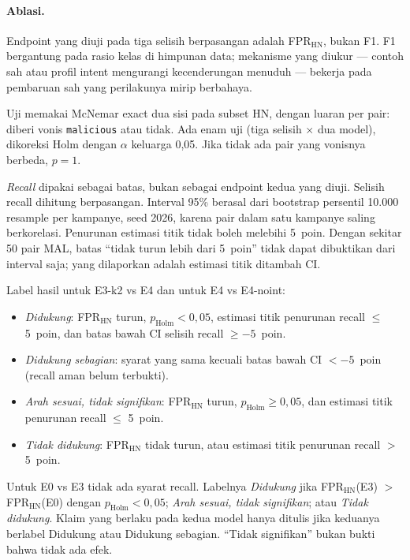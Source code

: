 \documentclass[a4paper,fleqn]{cas-dc}
\begin{document}
\paragraph{Ablasi.}
Endpoint yang diuji pada tiga selisih berpasangan adalah FPR$_{\mathrm{HN}}$,
bukan F1. F1 bergantung pada rasio kelas di himpunan data; mekanisme yang
diukur --- contoh sah atau profil intent mengurangi kecenderungan menuduh ---
bekerja pada pembaruan sah yang perilakunya mirip berbahaya.

Uji memakai McNemar exact dua sisi pada subset HN, dengan luaran per pair:
diberi vonis \texttt{malicious} atau tidak. Ada enam uji (tiga selisih
$\times$ dua model), dikoreksi Holm dengan $\alpha$ keluarga 0,05. Jika tidak
ada pair yang vonisnya berbeda, $p{=}1$.

\emph{Recall} dipakai sebagai batas, bukan sebagai endpoint kedua yang diuji.
Selisih recall dihitung berpasangan. Interval 95\% berasal dari bootstrap
persentil 10.000 resample per kampanye, seed 2026, karena pair dalam satu
kampanye saling berkorelasi. Penurunan estimasi titik tidak boleh melebihi
5~poin. Dengan sekitar 50 pair MAL, batas ``tidak turun lebih dari 5~poin''
tidak dapat dibuktikan dari interval saja; yang dilaporkan adalah estimasi
titik ditambah CI.

Label hasil untuk E3-k2 vs E4 dan untuk E4 vs E4-noint:

\begin{itemize}
\item \emph{Didukung}: FPR$_{\mathrm{HN}}$ turun, $p_{\mathrm{Holm}}{<}0{,}05$,
estimasi titik penurunan recall $\le$ 5~poin, dan batas bawah CI selisih
recall $\ge{-}5$~poin.
\item \emph{Didukung sebagian}: syarat yang sama kecuali batas bawah CI
$<{-}5$~poin (recall aman belum terbukti).
\item \emph{Arah sesuai, tidak signifikan}: FPR$_{\mathrm{HN}}$ turun,
$p_{\mathrm{Holm}}{\ge}0{,}05$, dan estimasi titik penurunan recall $\le$ 5~poin.
\item \emph{Tidak didukung}: FPR$_{\mathrm{HN}}$ tidak turun, atau estimasi
titik penurunan recall $>$ 5~poin.
\end{itemize}

Untuk E0 vs E3 tidak ada syarat recall. Labelnya \emph{Didukung} jika
FPR$_{\mathrm{HN}}$(E3) $>$ FPR$_{\mathrm{HN}}$(E0) dengan
$p_{\mathrm{Holm}}{<}0{,}05$; \emph{Arah sesuai, tidak signifikan}; atau
\emph{Tidak didukung}. Klaim yang berlaku pada kedua model hanya ditulis jika
keduanya berlabel Didukung atau Didukung sebagian. ``Tidak signifikan'' bukan
bukti bahwa tidak ada efek.
\end{document}
